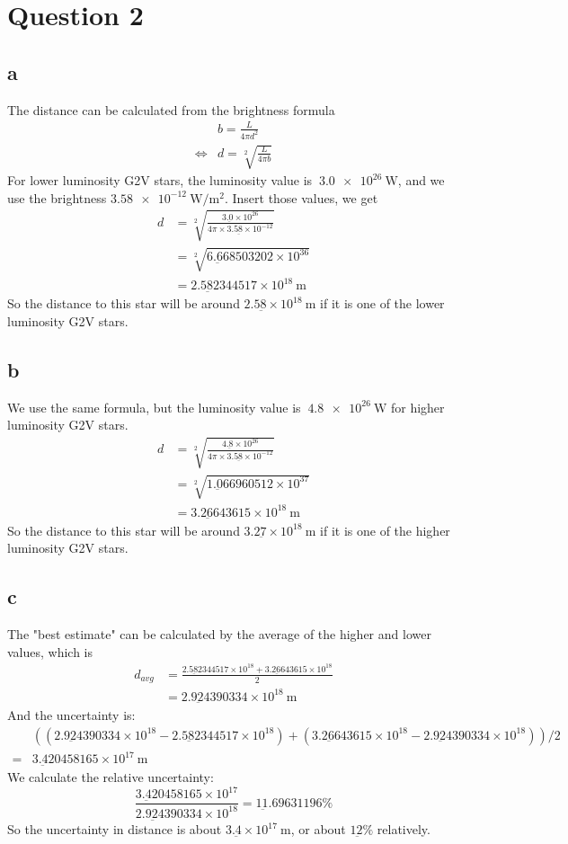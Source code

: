 \documentclass[11pt]{article}
\newcommand{\sci}[1]{\times 10^{#1}}
\begin{document}
\section*{Question 2}
\subsection*{a}
The distance can be calculated from the brightness formula
$$
\begin{aligned}
    &b = \frac{L}{4\pi d^2} \\
    \iff & d = \sqrt[2]{\frac{L}{4\pi b}}
\end{aligned}
$$
For lower luminosity G2V stars, the luminosity value is $~\SI{3.0e26}{\watt}$, 
and we use the brightness $\SI[per-mode=symbol]{3.58e-12}{\watt\per\meter^2}$. Insert those values, we get
$$
\begin{aligned}
    d &= \sqrt[2]{\frac{3.\underbar{0} \sci{26}}{4 \pi \times 3.5\underbar{8}\sci{-12}}} \\
    &= \sqrt[2]{6.\underbar{6}68503202 \sci{36}} \\
    &= 2.5\underbar{8}2344517 \sci{18} \SI{}{\meter}
\end{aligned}
$$
So the distance to this star will be around $2.5\underbar{8} \sci{18} \SI{}{\meter}$ if it is one of the lower luminosity G2V stars. 
\subsection*{b}
We use the same formula, but the luminosity value is $~\SI{4.8e26}{\watt}$ for higher luminosity G2V stars.
$$
\begin{aligned}
    d &= \sqrt[2]{\frac{4.\underbar{8} \sci{26}}{4 \pi \times 3.5\underbar{8}\sci{-12}}} \\
    &= \sqrt[2]{1.\underbar{0}66960512 \sci{37}} \\
    &= 3.2\underbar{6}643615 \sci{18} \SI{}{\meter}
\end{aligned}
$$
So the distance to this star will be around $3.2\underbar{7} \sci{18} \SI{}{\meter}$ if it is one of the higher luminosity G2V stars. 
\subsection*{c}
The "best estimate" can be calculated by the average of the higher and lower values, which is 
$$
\begin{aligned}
    d_{avg} &= \frac{2.5\underbar{8}2344517 \sci{18} + 3.2\underbar{6}643615 \sci{18}}{2} \\
    &= 2.9\underbar{2}4390334 \sci{18} \SI{}{\meter}
\end{aligned}
$$
And the uncertainty is:
$$
\begin{aligned}
&((2.9\underbar{2}4390334 \sci{18}-2.5\underbar{8}2344517 \sci{18})  + (3.2\underbar{6}643615 \sci{18}-2.9\underbar{2}4390334 \sci{18})) / 2 \\
= &3.\underbar{4}20458165 \sci{17} \SI{}{\meter}
\end{aligned}
$$
We calculate the relative uncertainty:
$$
\frac{3.\underbar{4}20458165 \sci{17}}{2.9\underbar{2}4390334 \sci{18}} = 1\underbar{1}.69631196 \%
$$
So the uncertainty in distance is about $3.\underbar{4} \sci{17} \SI{}{\meter}$, or about $1\underbar{2}\%$ relatively.
\end{document}

